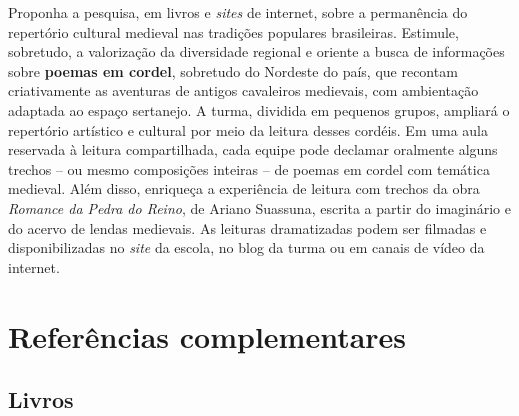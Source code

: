 \documentclass[11pt]{extarticle}
\begin{document}
  Proponha a pesquisa, em livros e \emph{sites} de internet, sobre a
  permanência do repertório cultural medieval nas tradições populares
  brasileiras. Estimule, sobretudo, a valorização da diversidade
  regional e oriente a busca de informações sobre \textbf{poemas em
  cordel}, sobretudo do Nordeste do país, que recontam criativamente as
  aventuras de antigos cavaleiros medievais, com ambientação adaptada ao
  espaço sertanejo. A turma, dividida em pequenos grupos, ampliará o
  repertório artístico e cultural por meio da leitura desses cordéis. Em
  uma aula reservada à leitura compartilhada, cada equipe pode declamar
  oralmente alguns trechos -- ou mesmo composições inteiras -- de poemas
  em cordel com temática medieval. Além disso, enriqueça a experiência
  de leitura com trechos da obra \emph{Romance da Pedra do Reino}, de
  Ariano Suassuna, escrita a partir do imaginário e do acervo de lendas
  medievais. As leituras dramatizadas podem ser filmadas e
  disponibilizadas no \emph{site} da escola, no blog da turma ou em
  canais de vídeo da internet.

\section{Referências complementares}

\subsection{Livros}
\end{document}
